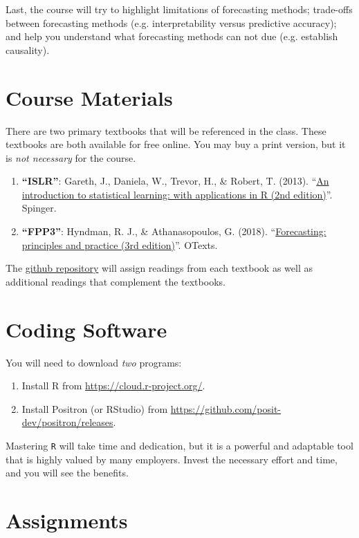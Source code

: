 \documentclass[12pt]{article}
\begin{document}
Last, the course will try to highlight limitations of forecasting methods; trade-offs between forecasting methods (e.g. interpretability versus predictive accuracy); and help you understand what forecasting methods can not due (e.g. establish causality). 


\newpage
\section*{Course Materials}

There are two primary textbooks that will be referenced in the class. These textbooks are both available for free online. You may buy a print version, but it is \emph{not necessary} for the course. 

\begin{enumerate}
  \item \textbf{``ISLR''}: Gareth, J., Daniela, W., Trevor, H., \& Robert, T. (2013). ``\href{https://www.statlearning.com}{An introduction to statistical learning: with applications in R (2nd edition)}''. Spinger.
  \item \textbf{``FPP3''}: Hyndman, R. J., \& Athanasopoulos, G. (2018). ``\href{https://otexts.com/fpp3/}{Forecasting: principles and practice (3rd edition)}''. OTexts.
\end{enumerate}

The \href{https://github.com/kylebutts/UARK_5753}{github repository} will assign readings from each textbook as well as additional readings that complement the textbooks.

\section*{Coding Software}

You will need to download \emph{two} programs:
\begin{enumerate}
  \item Install R from \url{https://cloud.r-project.org/}.
  \item Install Positron (or RStudio) from \url{https://github.com/posit-dev/positron/releases}. 
\end{enumerate}

\bigskip
Mastering \texttt{R} will take time and dedication, but it is a powerful and adaptable tool that is highly valued by many employers. Invest the necessary effort and time, and you will see the benefits.

\newpage
\section*{Assignments}
\end{document}
